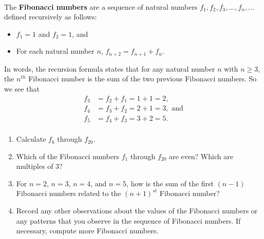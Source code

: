 \begin{previewactivity} \label{PA:fibonaccinumbers} \hfill \\
The \textbf{Fibonacci numbers} \label{fibonacci}
%
 are a sequence of natural numbers  $f_1 ,f_2 ,f_3 , \ldots ,f_n , \ldots $ 
\label{sym:fibonacci} defined recursively as follows:
\begin{itemize}
\item $f_1  = 1$ and  $f_2  = 1$, and

\item For each natural number  $n$,   $f_{n + 2}  = f_{n + 1}  + f_n $.
\end{itemize}
In words, the recursion formula states that for any natural number $n$ with $n \geq 3$, the $n^{th}$ Fibonacci number is the sum of the two previous Fibonacci numbers.  So we see that 
%
\begin{align*}
f_3  &= f_2  + f_1  = 1 + 1 = 2, \\
f_4  &= f_3  + f_2  = 2 + 1 = 3, \text{ and} \\
f_5  &= f_4  + f_3 = 3 + 2 = 5. \\
\end{align*}


%
\begin{enumerate}
\item Calculate  $f_6$ through $f_{20}$.


\item Which of the Fibonacci numbers $f_1$ through $f_{20}$ are even?  Which are multiples of 3?  
\item For $n = 2$, $n = 3$, $n = 4$, and $n = 5$, how is the sum of the first $(n - 1)$ Fibonacci numbers related to the $(n + 1)^{st}$ Fibonacci number?

\item Record any other observations about the values of the Fibonacci numbers or any patterns that you observe in the sequence of Fibonacci numbers.  If necessary, compute more Fibonacci numbers.

\end{enumerate}
\end{previewactivity}
\hbreak

\endinput
